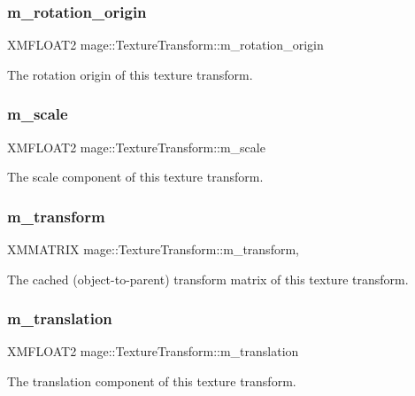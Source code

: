 \subsubsection{\texorpdfstring{m\+\_\+rotation\+\_\+origin}{m\_rotation\_origin}}
{\footnotesize\ttfamily X\+M\+F\+L\+O\+A\+T2 mage\+::\+Texture\+Transform\+::m\+\_\+rotation\+\_\+origin\hspace{0.3cm}{\ttfamily [private]}}

The rotation origin of this texture transform. \hypertarget{classmage_1_1_texture_transform_a57ecf30158fc8ba715c40742f1afa0bd}{}\label{classmage_1_1_texture_transform_a57ecf30158fc8ba715c40742f1afa0bd} 
\subsubsection{\texorpdfstring{m\+\_\+scale}{m\_scale}}
{\footnotesize\ttfamily X\+M\+F\+L\+O\+A\+T2 mage\+::\+Texture\+Transform\+::m\+\_\+scale\hspace{0.3cm}{\ttfamily [private]}}

The scale component of this texture transform. \hypertarget{classmage_1_1_texture_transform_ad801f906833544ca476908c241945ed6}{}\label{classmage_1_1_texture_transform_ad801f906833544ca476908c241945ed6} 
\subsubsection{\texorpdfstring{m\+\_\+transform}{m\_transform}}
{\footnotesize\ttfamily X\+M\+M\+A\+T\+R\+IX mage\+::\+Texture\+Transform\+::m\+\_\+transform\hspace{0.3cm}{\ttfamily [mutable]}, {\ttfamily [private]}}

The cached (object-\/to-\/parent) transform matrix of this texture transform. \hypertarget{classmage_1_1_texture_transform_a6b468f62dc90f84bbf877192ff167c22}{}\label{classmage_1_1_texture_transform_a6b468f62dc90f84bbf877192ff167c22} 
\subsubsection{\texorpdfstring{m\+\_\+translation}{m\_translation}}
{\footnotesize\ttfamily X\+M\+F\+L\+O\+A\+T2 mage\+::\+Texture\+Transform\+::m\+\_\+translation\hspace{0.3cm}{\ttfamily [private]}}

The translation component of this texture transform. 